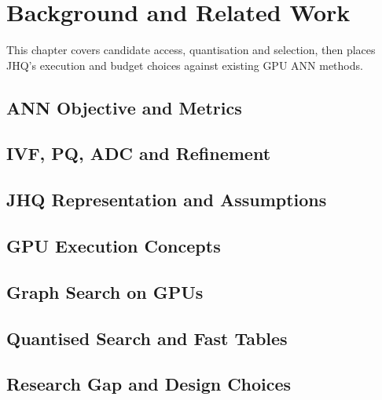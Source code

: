 \chapter{Background and Related Work}
\label{ch:background}
This chapter covers candidate access, quantisation and selection, then places JHQ's execution and budget choices against existing GPU ANN methods.

\section{ANN Objective and Metrics}
\label{sec:2-1}


\section{IVF, PQ, ADC and Refinement}
\label{sec:2-2}


\section{JHQ Representation and Assumptions}
\label{sec:2-3}


\section{GPU Execution Concepts}
\label{sec:2-4}


\section{Graph Search on GPUs}
\label{sec:2-5}


\section{Quantised Search and Fast Tables}
\label{sec:2-6}


\section{Research Gap and Design Choices}
\label{sec:2-7}


